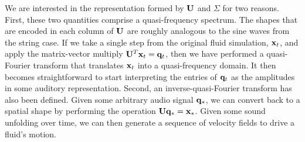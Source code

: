 	



We are interested in the representation formed by $\mathbf{U}$ and $\Sigma$ for two reasons. First, these two quantities comprise a quasi-frequency spectrum. The shapes that are encoded in each column of $\mathbf{U}$ are roughly analogous to the sine waves from the string case. If we take a single step from the original fluid simulation, $\mathbf{x}_t$, and apply the matrix-vector multiply $\mathbf{U}^T\mathbf{x}_t = \mathbf{q}_t$, then we have performed a quasi-Fourier transform that translates $\mathbf{x}_t$ into a quasi-frequency domain. It then becomes straightforward to start interpreting the entries of $\mathbf{q}_t$ as the amplitudes in some auditory representation. Second, an inverse-quasi-Fourier transform has also been defined. Given some arbitrary audio signal $\mathbf{q}_*$, we can convert back to a spatial shape by performing the operation $\mathbf{U} \mathbf{q}_* = \mathbf{x}_*$. Given some sound unfolding over time, we can then generate a sequence of velocity fields to drive a fluid's motion.


